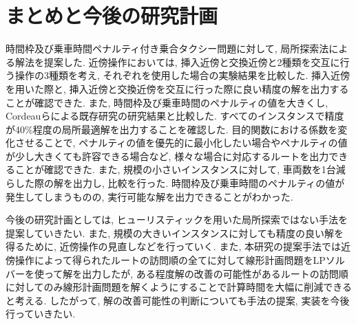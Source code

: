 \chapter{まとめと今後の研究計画}\label{conclution}
時間枠及び乗車時間ペナルティ付き乗合タクシー問題に対して, 局所探索法による解法を提案した. 近傍操作においては, 挿入近傍と交換近傍と2種類を交互に行う操作の3種類を考え, それぞれを使用した場合の実験結果を比較した. 挿入近傍を用いた際と, 挿入近傍と交換近傍を交互に行った際に良い精度の解を出力することが確認できた. また, 時間枠及び乗車時間のペナルティの値を大きくし, Cordeauらによる既存研究の研究結果と比較した. すべてのインスタンスで精度が40\%程度の局所最適解を出力することを確認した. 目的関数における係数を変化させることで, ペナルティの値を優先的に最小化したい場合やペナルティの値が少し大きくても許容できる場合など, 様々な場合に対応するルートを出力できることが確認できた.
また, 規模の小さいインスタンスに対して, 車両数を1台減らした際の解を出力し, 比較を行った. 時間枠及び乗車時間のペナルティの値が発生してしまうものの, 実行可能な解を出力できることがわかった.

今後の研究計画としては, ヒューリスティックを用いた局所探索ではない手法を提案していきたい.
また, 規模の大きいインスタンスに対しても精度の良い解を得るために, 近傍操作の見直しなどを行っていく.
また, 本研究の提案手法では近傍操作によって得られたルートの訪問順の全てに対して線形計画問題をLPソルバーを使って解を出力したが, ある程度解の改善の可能性があるルートの訪問順に対してのみ線形計画問題を解くようにすることで計算時間を大幅に削減できると考える. したがって, 解の改善可能性の判断についても手法の提案, 実装を今後行っていきたい.
